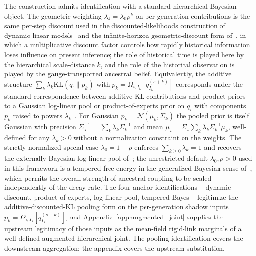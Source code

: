 \documentclass[11pt]{article}
\begin{document}
The construction admits identification with a standard hierarchical-Bayesian object. The geometric weighting $\lambda_k = \lambda_0\rho^k$ on per-generation contributions is the same per-step discount used in the discounted-likelihoods construction of dynamic linear models~\cite[\S 10.7]{WestHarrison1997} and the infinite-horizon geometric-discount form of~\cite{Smith1979}, in which a multiplicative discount factor controls how rapidly historical information loses influence on present inference; the role of historical time is played here by the hierarchical scale-distance $k$, and the role of the historical observation is played by the gauge-transported ancestral belief. Equivalently, the additive structure $\sum_k \lambda_k \mathrm{KL}(q_i \| p_k)$ with $p_k = \Omega_{i,I_k}[q_{I_k}^{(s+k)}]$ corresponds under the standard correspondence between additive KL contributions and product priors~\cite{Friston2010, blei2017variational} to a Gaussian log-linear pool or product-of-experts prior on $q_i$ with components $p_k$ raised to powers $\lambda_k$~\cite{GenestZidek1986, HintonPoE2002}. For Gaussian $p_k = \mathcal{N}(\mu_k, \Sigma_k)$ the pooled prior is itself Gaussian with precision $\Sigma_\star^{-1} = \sum_k \lambda_k \Sigma_k^{-1}$ and mean $\mu_\star = \Sigma_\star \sum_k \lambda_k \Sigma_k^{-1}\mu_k$, well-defined for any $\lambda_k > 0$ without a normalization constraint on the weights. The strictly-normalized special case $\lambda_0 = 1 - \rho$ enforces $\sum_{k \ge 0}\lambda_k = 1$ and recovers the externally-Bayesian log-linear pool of~\cite{GenestZidek1986}; the unrestricted default $\lambda_0, \rho > 0$ used in this framework is a tempered free energy in the generalized-Bayesian sense of~\cite{BissiriHolmesWalker2016}, which permits the overall strength of ancestral coupling to be scaled independently of the decay rate. The four anchor identifications -- \cite{WestHarrison1997} dynamic-discount, \cite{HintonPoE2002} product-of-experts, \cite{GenestZidek1986} log-linear pool, \cite{BissiriHolmesWalker2016} tempered Bayes -- legitimize the additive-discounted-KL pooling form on the per-generation shadow inputs $p_k = \Omega_{i,I_k}[q_{I_k}^{(s+k)}]$, and Appendix~\ref{app:augmented_joint} supplies the upstream legitimacy of those inputs as the mean-field rigid-link marginals of a well-defined augmented hierarchical joint. The pooling identification covers the downstream aggregation; the appendix covers the upstream substitution.
\end{document}
